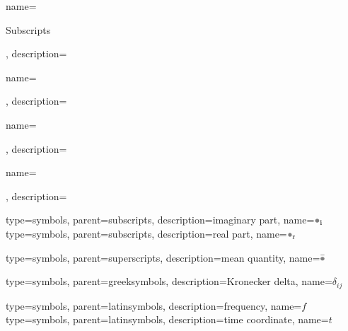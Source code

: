    {name={\parbox{\textwidth}{{Subscripts}\aftsymbgroup}},                 description={\nopostdesc}}
 {name={\parbox{\textwidth}{\aftsymbgroup}},  description={\nopostdesc}}
 {name={\parbox{\textwidth}{\aftsymbgroup}}, description={\nopostdesc}}
 {name={\parbox{\textwidth}{\aftsymbgroup}}, description={\nopostdesc}}

     {type=symbols, parent=subscripts,   description={imaginary part},  name={\ensuremath{\textcolor{ThesisDarkGrey}{\bullet}_{\textnormal{i}}}}}
     {type=symbols, parent=subscripts,   description={real part},       name={\ensuremath{\textcolor{ThesisDarkGrey}{\bullet}_{\textnormal{r}}}}}

    {type=symbols, parent=superscripts, description={mean quantity},   name={\ensuremath{\bar{\textcolor{ThesisDarkGrey}{\bullet}}}}}

 {type=symbols, parent=greeksymbols, description={Kronecker delta}, name={\ensuremath{\delta_{ij}}}}

       {type=symbols, parent=latinsymbols, description={frequency},       name={\ensuremath{f}}}
       {type=symbols, parent=latinsymbols, description={time coordinate}, name={\ensuremath{t}}}
